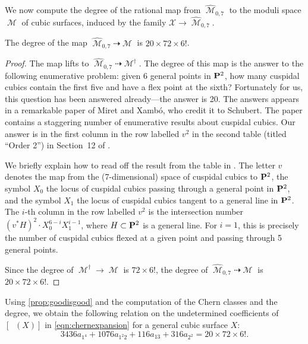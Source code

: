 \documentclass[reqno]{amsart}
\DeclareMathOperator{\Orb}{\overline{Orb}}
\DeclareMathOperator{\M}{\mathcal{M}}
\renewcommand{\to}{{\longrightarrow}}
\renewcommand {\P}{{\bf P}}
\numberwithin{equation}{section}
\begin{document}
We now compute the degree of the rational map from $\widehat{\M}_{0,7}$ to the moduli space $\M$ of cubic surfaces, induced by the family $\mathcal{X} \to \widehat{\M}_{0,7}$.
\begin{proposition}\label{prop:deg3}
  The degree of the map $\widehat{\M}_{0,7} \dashrightarrow \M$ is $20 \times 72 \times 6!$.
\end{proposition}
\begin{proof}
  The map lifts to $\widehat{\M}_{0,7} \dashrightarrow \M^{\dagger}$.
  The degree of this map is the answer to the following enumerative problem: given 6 general points in $\P^2$, how many cuspidal cubics contain the first five and have a flex point at the sixth?
  Fortunately for us, this question has been answered already---the answer is 20.
  The answers appears in a remarkable paper \cite{mir.des:89} of Miret and Xamb\'o, who credit it to Schubert.
  The paper contains a staggering number of enumerative results about cuspidal cubics.
  Our answer is in the first column in the row labelled $v^2$ in the second table (titled ``Order 2'') in Section~12 of \cite{mir.des:89}.

  We briefly explain how to read off the result from the table in \cite{mir.des:89}.
  The letter $v$ denotes the map from the (7-dimensional) space of cuspidal cubics to $\P^2$,
  the symbol $X_0$ the locus of cuspidal cubics passing through a general point in $\P^2$, and the symbol $X_1$ the locus of cuspidal cubics tangent to a general line in $\P^2$.
  The $i$-th column in the row labelled $v^2$ is the intersection number $(v^* H)^2 \cdot X_0^{6-i}X_1^{i-1}$, where $H \subset \P^2$ is a general line.
  For $i = 1$, this is precisely the number of cuspidal cubics flexed at a given point and passing through 5 general points.

  Since the degree of $\M^{\dagger} \to \M$ is $72 \times 6!$, the degree of $\widehat{\M}_{0,7} \dashrightarrow \M$ is $20 \times 72 \times 6!$.
\end{proof}

Using \autoref{prop:goodisgood} and the computation of the Chern classes and the degree, we obtain the following relation on the undetermined coefficients of $[\Orb(X)]$ in
\eqref{eqn:chernexpansion} for a general cubic surface $X$:
\begin{equation}
  \label{eq:relation3}
  3436a_{1^4} + 1076a_{1^{2}2} + 116 a_{13} + 316 a_{2^{2}} = 20 \times 72 \times 6!.
\end{equation}


\end{document}
